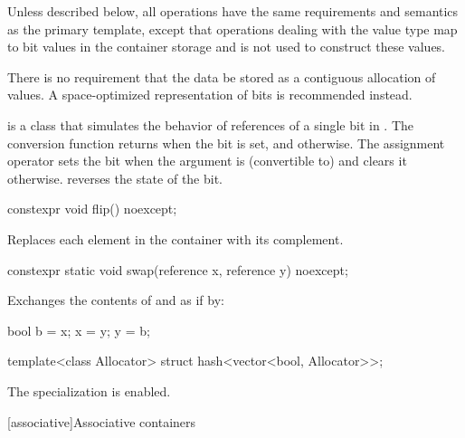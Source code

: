 \pnum
Unless described below, all operations have the same requirements and
semantics as the primary  template, except that operations
dealing with the  value type map to bit values in the
container storage and
is not used to construct these values.

\pnum
There is no requirement that the data be stored as a contiguous allocation
of  values. A space-optimized representation of bits is
recommended instead.

\pnum
{}
is a class that simulates the behavior of references of a single bit in
. The conversion function returns 
when the bit is set, and  otherwise. The assignment operator
sets the bit when the argument is (convertible to)  and
clears it otherwise.  reverses the state of the bit.

%
\begin{itemdecl}
constexpr void flip() noexcept;
\end{itemdecl}

\begin{itemdescr}
\pnum
\effects
Replaces each element in the container with its complement.
\end{itemdescr}

%
\begin{itemdecl}
constexpr static void swap(reference x, reference y) noexcept;
\end{itemdecl}

\begin{itemdescr}
\pnum
\effects
Exchanges the contents of  and  as if by:

\begin{codeblock}
bool b = x;
x = y;
y = b;
\end{codeblock}

\end{itemdescr}

\begin{itemdecl}
template<class Allocator> struct hash<vector<bool, Allocator>>;
\end{itemdecl}

\begin{itemdescr}
\pnum
The specialization is enabled.
\end{itemdescr}

[associative]{Associative containers}

